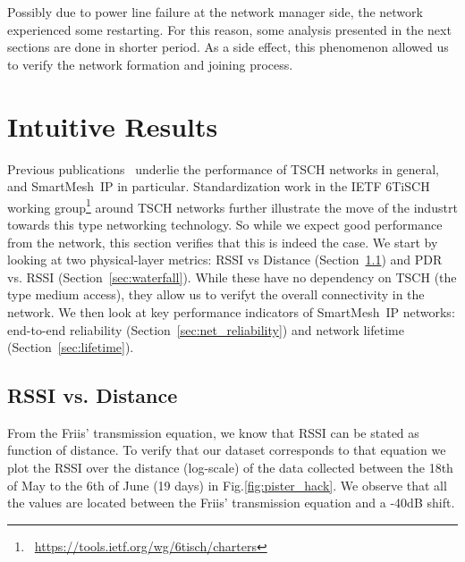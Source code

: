 \documentclass{sig-alternate}
\newcommand{\smip}                {SmartMesh~IP\xspace}
\begin{document}
Possibly due to power line failure at the network manager side, the network experienced some restarting.
For this reason, some analysis presented in the next sections are done in shorter period.
As a side effect, this phenomenon allowed us to verify the network formation and joining process.

\section{Intuitive Results}
\label{sec:intuitive}

Previous publications~\cite{watteyne15industrial,watteyne16peach,watteyne10mitigating,watteyne09reliability} underlie the performance of TSCH networks in general, and \smip in particular.
Standardization work in the IETF 6TiSCH working group\footnote{~\url{https://tools.ietf.org/wg/6tisch/charters}} around TSCH networks further illustrate the move of the industrt towards this type networking technology.
So while we expect good performance from the network, this section verifies that this is indeed the case.
We start by looking at two physical-layer metrics: RSSI vs Distance (Section~\ref{sec:rssi_distance}) and PDR vs. RSSI (Section~\ref{sec:waterfall}).
While these have no dependency on TSCH (the type medium access), they allow us to verifyt the overall connectivity in the network.
We then look at key performance indicators of \smip networks: end-to-end reliability (Section~\ref{sec:net_reliability}) and network lifetime (Section~\ref{sec:lifetime}).

\subsection{RSSI vs. Distance}
\label{sec:rssi_distance}

From the Friis' transmission equation, we know that RSSI can be stated as function of distance.
To verify that our dataset corresponds to that equation we plot the RSSI over the distance (log-scale) of the data collected between the 18th of May to the 6th of June (19 days) in Fig.\ref{fig:pister_hack}.
We observe that all the values are located between the Friis' transmission equation and a -40dB shift.
\end{document}
